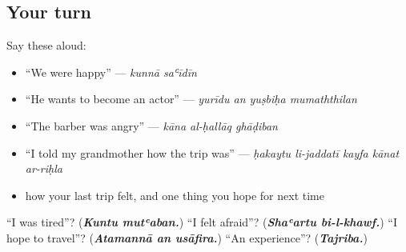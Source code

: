 \subsection*{Your turn}
Say these aloud:

\begin{itemize}
\raggedright
  \item \textquotedblleft{}We were happy\textquotedblright{} — \emph{kunnā saʿīdīn}
  \item \textquotedblleft{}He wants to become an actor\textquotedblright{} — \emph{yurīdu an yuṣbiḥa mumaththilan}
  \item \textquotedblleft{}The barber was angry\textquotedblright{} — \emph{kāna al-ḥallāq ghāḍiban}
  \item \textquotedblleft{}I told my grandmother how the trip was\textquotedblright{} — \emph{ḥakaytu li-jaddatī kayfa kānat ar-riḥla}
  \item how your last trip felt, and one thing you hope for next time
\end{itemize}

\begin{tcolorbox}[breakable,colback=teal!4,colframe=teal!35!black,title={Before you move on}]
\textquotedblleft{}I was tired\textquotedblright{}? (\emph{\textbf{Kuntu mutʿaban.}}) \textquotedblleft{}I felt afraid\textquotedblright{}? (\emph{\textbf{Shaʿartu bi-l-khawf.}}) \textquotedblleft{}I hope to travel\textquotedblright{}? (\emph{\textbf{Atamannā an usāfira.}}) \textquotedblleft{}An experience\textquotedblright{}? (\emph{\textbf{Tajriba.}})
\end{tcolorbox}
